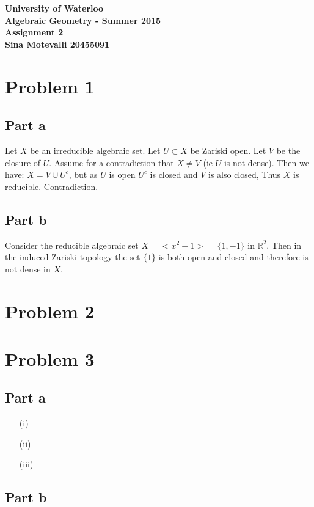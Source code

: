 \documentclass[12pt]{article}
\begin{document}
\begin{center}
  {\Large\bf University of Waterloo}\\
  \vspace{3mm}
         {\Large\bf Algebraic Geometry - Summer 2015}\\
         \vspace{2mm}
                {\Large\bf Assignment 2}\\
                \vspace{3mm}
                \textbf{Sina Motevalli 20455091}
\end{center}
\section*{Problem 1}
\subsection*{Part a}
Let $X$ be an irreducible algebraic set. Let $U \subset X$ be Zariski open. Let $V$ be the closure of $U$. Assume for a contradiction that $X \not= V$ (ie $U$ is not dense). Then we have: $X=V \cup U^c $, but as $U$ is open $U^c$ is closed and $V$ is also closed, Thus $X$ is reducible. Contradiction.
\subsection*{Part b}
Consider the reducible algebraic set $X=<x^2-1>=\{1,-1\}$ in $\mathbb{R}^2$. Then in the induced Zariski topology the set $\{1\}$ is both open and closed and therefore is not dense in $X$.
\section*{Problem 2}
\section*{Problem 3}
\subsection{Part a}
\begin{enumerate}
\item[(i)]
\item[(ii)]
\item[(iii)]
\end{enumerate}
\subsection*{Part b}
\end{document}
